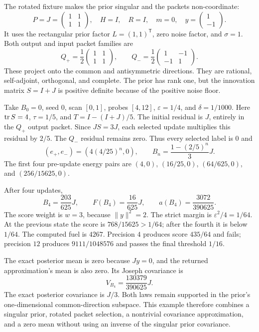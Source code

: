 The rotated fixture makes the prior singular and the packets non-coordinate:
\[
 P=J=\begin{pmatrix}1&1\\1&1\end{pmatrix},\quad H=I,
 \quad R=I,\quad m=0,\quad y=\begin{pmatrix}1\\-1\end{pmatrix}.
\]
It uses the rectangular prior factor $L=(1,1)^{\mathsf T}$, zero noise factor,
and $\sigma=1$. Both output and input packet families are
\[
 Q_+=\frac12\begin{pmatrix}1&1\\1&1\end{pmatrix},\qquad
 Q_-=\frac12\begin{pmatrix}1&-1\\-1&1\end{pmatrix}.
\]
These project onto the common and antisymmetric directions. They are rational,
self-adjoint, orthogonal, and complete. The prior has rank one, but the innovation
matrix $S=I+J$ is positive definite because of the positive noise floor.

Take $B_0=0$, seed $0$, scan $[0,1]$, probes $[4,12]$, $\varepsilon=1/4$, and
$\delta=1/1000$. Here $\operatorname{tr} S=4$, $\tau=1/5$, and
$T=I-(I+J)/5$. The initial residual is $J$, entirely in the $Q_+$ output packet.
Since $JS=3J$, each selected update multiplies this residual by $2/5$. The
$Q_-$ residual remains zero. Thus every selected label is $0$ and
\[
 (e_+,e_-)=(4(4/25)^n,0),\qquad B_n=\frac{1-(2/5)^n}{3}J.
\]
The first four pre-update energy pairs are $(4,0)$, $(16/25,0)$,
$(64/625,0)$, and $(256/15625,0)$.

After four updates,
\[
 B_4=\frac{203}{625}J,\qquad F(B_4)=\frac{16}{625}J,
 \qquad a(B_4)=\frac{3072}{390625}.
\]
The score weight is $w=3$, because $\lVert y\rVert^2=2$. The strict margin is
$\varepsilon^2/4=1/64$. At the previous state the score is $768/15625>1/64$;
after the fourth it is below $1/64$. The computed fuel is $4267$. Precision $4$
produces score $435/64$ and fails; precision $12$ produces $9111/1048576$ and
passes the final threshold $1/16$.

The exact posterior mean is zero because $Jy=0$, and the returned approximation's
mean is also zero. Its Joseph covariance is
\[
 V_{B_4}=\frac{130379}{390625}J.
\]
The exact posterior covariance is $J/3$. Both laws remain supported in the prior's
one-dimensional common-direction subspace. This example therefore combines a
singular prior, rotated packet selection, a nontrivial covariance approximation,
and a zero mean without using an inverse of the singular prior covariance.

